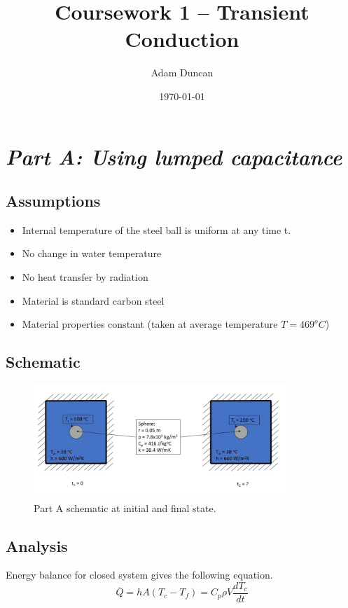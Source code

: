 \documentclass[11pt]{article}
\title{Coursework 1 – Transient Conduction}
\author{Adam Duncan}
\date{\today}
\begin{document}
\maketitle

\section{\emph{Part A: Using lumped capacitance}}
\subsection{Assumptions}
\begin{itemize}
	\item Internal temperature of the steel ball is uniform at any time t.
	\item No change in water temperature
	\item No heat transfer by radiation
	\item Material is standard carbon steel
	\item Material properties constant (taken at average temperature $T = 469 ^{o}C$)
\end{itemize}
\subsection{Schematic}
\begin{figure}[h]
	\centering
	\includegraphics[width=0.85\textwidth]{part_a_fig}
	\caption{Part A schematic at initial and final state.}
	\label{fig:schem_a}
\end{figure}
\subsection{Analysis}
Energy balance for closed system gives the following equation.
\begin{equation}\label{eqn_1}
	\stackrel{.}{Q} = hA(T_{c}-T_{f}) = C_{p}\rho V \frac{dT_{c}}{dt}
\end{equation}
\end{document}
